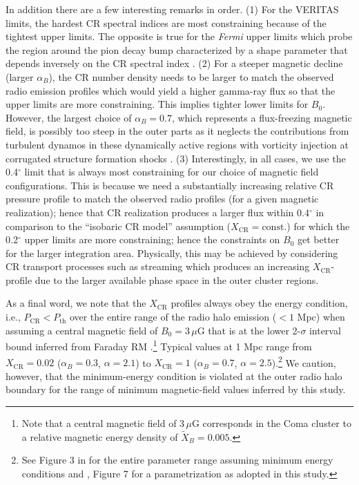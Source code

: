 \documentclass[12pt,manuscript]{aastex}
\newcommand{\rmn}{\mathrm}
\newcommand{\CR}{\mathrm{CR}}
\begin{document}
In addition there are a few interesting remarks in order. (1) For the VERITAS limits, the hardest CR spectral indices are most constraining because of the tightest upper limits. The opposite is true for the {\em Fermi} upper limits which probe the region around the pion decay bump characterized by a shape parameter that depends inversely on the CR spectral index \citep{article:PfrommerEnsslin:2004b}.  (2) For a steeper magnetic decline (larger $\alpha_{B}$), the CR number density needs to be larger to match the observed radio emission profiles which would yield a higher gamma-ray flux so that the upper limits are more constraining. This implies tighter lower limits for $B_{0}$. However, the largest choice of $\alpha_B=0.7$, which represents a flux-freezing magnetic field, is possibly too steep in the outer parts as it neglects the contributions from turbulent dynamos in these dynamically active regions with vorticity injection at corrugated structure formation shocks
\citep{article:PfrommerJones:2011}. (3) Interestingly, in all cases, we use the 0.4$^{\circ}$ limit that is always most constraining for our choice of magnetic field configurations.  This is because we need a substantially increasing relative CR pressure profile to match the observed radio profiles (for a given magnetic realization); hence that CR realization produces a larger flux within 0.4$^{\circ}$ in comparison to the ``isobaric CR model'' assumption ($X_{\CR} = \rmn{const.}$) for which the 0.2$^{\circ}$ upper limits are more constraining; hence the constraints on $B_{0}$ get better for the larger integration area. Physically, this may be achieved by considering CR transport processes such as streaming which produces an increasing $X_{\CR}$-profile due to the larger available phase space in the outer cluster regions.

As a final word, we note that the $X_{\CR}$ profiles always obey the energy condition, i.e., $P_{\CR} < P_{\mathrm{th}}$ over the entire range of the radio halo emission ($< 1$ Mpc) when assuming a central magnetic field of $B_{0}=3\,\mu$G that is at the lower 2-$\sigma$ interval bound inferred from Faraday RM \citep{article:Bonafede_etal:2010}.\footnote{Note that a central magnetic field of $3\,\mu$G corresponds in the Coma cluster to a relative magnetic energy density of $\tilde{X}_B=0.005$.} Typical values at 1 Mpc range from $X_{\CR} = 0.02$ ($\alpha_{B}=0.3$, $\alpha=2.1$) to $X_{\CR} = 1$ ($\alpha_{B}=0.7$, $\alpha=2.5$).\footnote{See Figure 3 in \citet{article:PfrommerEnsslin:2004a} for the entire parameter range assuming minimum energy conditions and \citet{article:PfrommerEnsslin:2004b}, Figure 7 for a parametrization as adopted in this study.} We caution, however, that the minimum-energy condition is violated at the outer radio halo boundary for the range of minimum
magnetic-field values inferred by this study.
\end{document}
